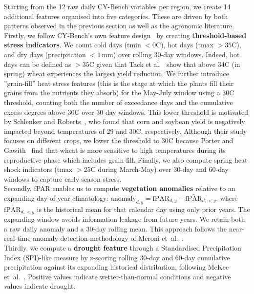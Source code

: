 \documentclass[pdflatex,sn-mathphys-num, oneside, 11pt]{sn-jnl}%
\theoremstyle{thmstyleone}%
\theoremstyle{thmstyletwo}%
\theoremstyle{thmstylethree}%
\begin{document}
Starting from the 12 raw daily CY-Bench variables per region, we create 14 additional features organised into five categories. These are driven by both patterns observed in the previous section as well as the agronomic literature.\\

Firstly, we follow CY-Bench's own feature design~\cite{bib17} by creating \textbf{threshold-based stress indicators}. We count cold days (tmin $< 0$\textdegree C), hot days (tmax $> 35$\textdegree C), and dry days (precipitation $< 1$\,mm) over rolling 30-day windows. Indeed, hot days can be defined as $> 35$\textdegree C given that Tack et al.~\cite{bib_tack2015} show that above 34\textdegree C (in spring) wheat experiences the largest yield reduction. We further introduce ''grain-fill'' heat stress features (this is the stage at which the plants fill their grains from the nutrients they absorb) for the May-July window using a 30\textdegree C threshold, counting both the number of exceedance days and the cumulative excess degrees above 30\textdegree C over 30-day windows. This lower threshold is motivated by Schlenker and Roberts~\cite{bib_schlenker2009}, who found that corn and soybean yield is negatively impacted beyond temperatures of 29 and 30\textdegree C, respectively. Although their study focuses on different crops, we lower the threshold to 30\textdegree C because Porter and Gawith~\cite{bib_porter1999} find that wheat is more sensitive to high temperatures during its reproductive phase which includes grain-fill. Finally, we also compute spring heat shock indicators (tmax $> 25$\textdegree C during March-May) over 30-day and 60-day windows to capture early-season stress.\\

Secondly, fPAR enables us to compute \textbf{vegetation anomalies} relative to an expanding day-of-year climatology: $\text{anomaly}_{d,y} = \text{fPAR}_{d,y} - \bar{\text{fPAR}}_{d,<y}$, where $\bar{\text{fPAR}}_{d,<y}$ is the historical mean for that calendar day using only prior years. The expanding window avoids information leakage from future years. We retain both a raw daily anomaly and a 30-day rolling mean. This approach follows the near-real-time anomaly detection methodology of Meroni et~al.~\cite{bib_meroni2019}.\\

Thirdly, we compute a \textbf{drought feature} through a Standardised Precipitation Index (SPI)-like measure by z-scoring rolling 30-day and 60-day cumulative precipitation against its expanding historical distribution, following McKee et~al.~\cite{bib_mckee1993}. Positive values indicate wetter-than-normal conditions and negative values indicate drought.\\
\end{document}
